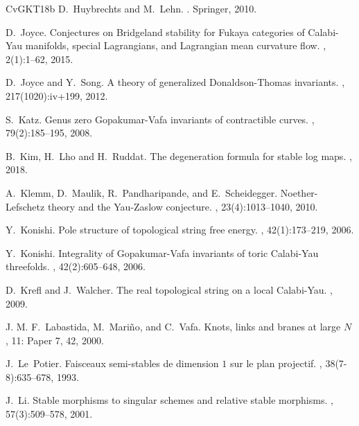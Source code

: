\documentclass[11pt,letterpaper]{amsart}
\begin{document}
\begin{thebibliography}{CvGKT18b}
D.~Huybrechts and M.~Lehn.
.
\newblock Springer, 2010.


D.~Joyce.
\newblock Conjectures on {B}ridgeland stability for {F}ukaya categories of
  {C}alabi-{Y}au manifolds, special {L}agrangians, and {L}agrangian mean
  curvature flow.
, 2(1):1--62, 2015.

D.~Joyce and Y.~Song.
\newblock A theory of generalized {D}onaldson-{T}homas invariants.
, 217(1020):iv+199, 2012.

S.~Katz.
\newblock Genus zero {G}opakumar-{V}afa invariants of contractible curves.
, 79(2):185--195, 2008.

B.~Kim, H.~Lho and H.~Ruddat.
\newblock The degeneration formula for stable log maps.
, 2018.

A.~Klemm, D.~Maulik, R.~Pandharipande, and E.~Scheidegger.
\newblock Noether-{L}efschetz theory and the {Y}au-{Z}aslow conjecture.
, 23(4):1013--1040, 2010.



Y.~Konishi.
\newblock Pole structure of topological string free energy.
,
42(1):173--219, 2006.


Y.~Konishi.
\newblock Integrality of {G}opakumar-{V}afa invariants of toric {C}alabi-{Y}au
  threefolds.
, 42(2):605--648, 2006.

D.~Krefl and J.~Walcher.
\newblock The real topological string on a local {C}alabi-{Y}au.
, 2009.


J. M. F.~Labastida, M.~Mari\~{n}o, and C.~Vafa.
\newblock Knots, links and branes at large {$N$}
,
11: Paper 7, 42, 2000.


J.~Le~Potier.
\newblock Faisceaux semi-stables de dimension {$1$} sur le plan projectif.
, 38(7-8):635--678, 1993.


J.~Li.
\newblock Stable morphisms to singular schemes and relative stable morphisms.
,
57(3):509--578, 2001.
 


\end{thebibliography}
\end{document}
